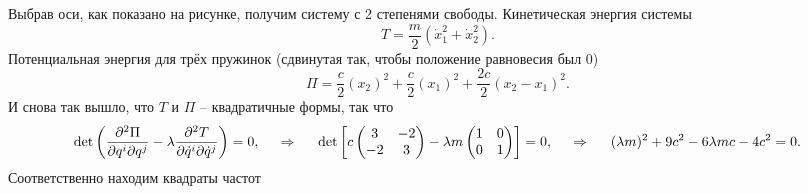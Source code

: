 Выбрав оси, как показано на рисунке, получим систему с 2 степенями свободы.  Кинетическая энергия системы
\begin{equation*}
    T = \frac{m}{2} \left(
        \dot{x}_1^2 + \dot{x}_2^2
    \right).
\end{equation*}
Потенциальная энергия для трёх пружинок (сдвинутая так, чтобы положение равновесия был $0$)
\begin{equation*}
    \Pi = \frac{c}{2} (x_2)^2 + \frac{c}{2} (x_1)^2 + \frac{2c}{2}
    \left(
       x_2 - x_1
    \right)^2.
\end{equation*}
И снова так вышло, что $T$ и $\Pi$ -- квадратичные формы, так что 
\begin{equation*}
     \det \left(
     \frac{\partial^2 \Pi}{\partial q^i \partial q^j} - \lambda \frac{\partial^2 T}{\partial \dot{q}^i \partial \dot{q}^j}\right) = 0,
     \hspace{0.5cm} \Rightarrow \hspace{0.5cm}
     \det\left[
        c\begin{pmatrix}
            3 & -2 \\
            -2 & 3 \\
        \end{pmatrix} - 
        \lambda m\begin{pmatrix}
            1 & 0 \\
            0 & 1 \\
        \end{pmatrix}
     \right] = 0,
     \hspace{0.5cm} \Rightarrow \hspace{0.5cm}
     (\lambda m)^2 + 9 c^2 - 6 \lambda m c - 4 c^2 = 0.
\end{equation*}
Соответственно находим квадраты частот

